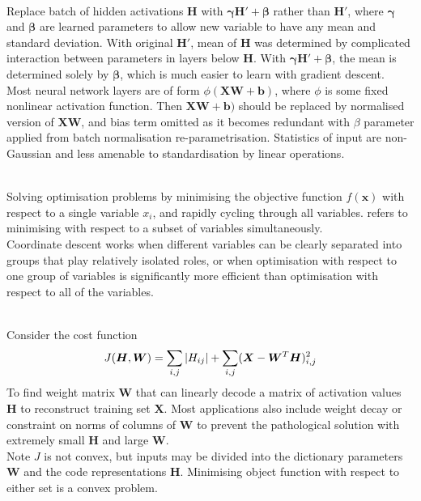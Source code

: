 \begin{remark} \\
Replace batch of hidden activations $\bm{H}$ with $\bm{\gamma} \bm{H}' + \bm{\beta}$ rather than $\bm{H}'$, where $\bm{\gamma}$ and $\bm{\beta}$ are learned parameters to allow new variable to have any mean and standard deviation. With original $\bm{H}'$, mean of $\bm{H}$ was determined by complicated interaction between parameters in layers below $\bm{H}$. With $\bm{\gamma} \bm{H}' + \bm{\beta}$, the mean is determined solely by $\bm{\beta}$, which is much easier to learn with gradient descent.\\
Most neural network layers are of form $\phi(\bm{X} \bm{W} + \bm{b})$, where $\phi$ is some fixed nonlinear activation function. Then $\bm{X} \bm{W} + \bm{b})$ should be replaced by normalised version of $\bm{X} \bm{W}$, and bias term omitted as it becomes redundant with $\beta$ parameter applied from batch normalisation re-parametrisation. Statistics of input are non-Gaussian and less amenable to standardisation by linear operations.	
\end{remark}

\begin{remark} \\
Solving optimisation problems by minimising the objective function $f(\bm{x})$ with respect to a single variable $x_i$, and rapidly cycling through all variables.  refers to minimising with respect to a subset of variables simultaneously.\\
 Coordinate descent works when different variables can be clearly separated into groups that play relatively isolated roles, or when optimisation with respect to one group of variables is significantly more efficient than optimisation with respect to all of the variables.
\end{remark}

\begin{example} \\
Consider the cost function
\begin{align}
J(\bm{H}, \bm{W}) = \sum\limits_{i,j} \left\lvert H_{ij}\right\rvert + \sum\limits_{i,j} (\bm{X} - \bm{W}^T \bm{H})^2_{i,j} \nonumber
\end{align}
To find weight matrix $\bm{W}$ that can linearly decode a matrix of activation values $\bm{H}$ to reconstruct training set $\bm{X}$. Most applications also include weight decay or constraint on norms of columns of $\bm{W}$ to prevent the pathological solution with extremely small $\bm{H}$ and large $\bm{W}$.\\
Note $J$ is not convex, but inputs may be divided into the dictionary parameters $\bm{W}$ and the code representations $\bm{H}$. Minimising object function with respect to either set is a convex problem.
\end{example}
